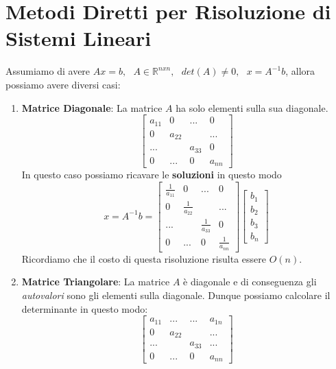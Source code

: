 \documentclass{article}
\begin{document}
\newpage

\section{Metodi Diretti per Risoluzione di Sistemi Lineari}

Assumiamo di avere $Ax = b, \: \: \: A\in \mathbb{R}^{nxn}, \: \: \: det(A)\neq0, \: \: \: x = A^{-1}b$, allora possiamo avere diversi casi:

\begin{enumerate}
    \item \textbf{Matrice Diagonale}: La matrice $A$ ha solo elementi sulla sua diagonale.
    \[ 
    \begin{bmatrix}
    a_{11} & 0 & ...  & 0\\
    0 & a_{22} &  & ...\\
     ...&  & a_{33} &  0\\
     0& ... & 0 & a_{nn}
    \end{bmatrix} 
    \]
    In questo caso possiamo ricavare le \textbf{soluzioni} in questo modo
    \[ x = A^{-1}b = \begin{bmatrix}
    \frac{1}{a_{11}} & 0 & ...  & 0\\
    0 & \frac{1}{a_{22}} &  & ...\\
     ...&  & \frac{1}{a_{33}} &  0\\
     0& ... & 0 & \frac{1}{a_{nn}}
    \end{bmatrix}
    \begin{bmatrix}
    b_{1}\\    
    b_{2}\\
    b_{3}\\
    b_{n}
    \end{bmatrix}  \]
    Ricordiamo che il costo di questa risoluzione risulta essere $O(n)$.
    \item \textbf{Matrice Triangolare}: La matrice $A$ è diagonale e di conseguenza gli \textit{autovalori} sono gli elementi sulla diagonale. Dunque possiamo calcolare il determinante in questo modo:
    \vspace*{10px}
    \[
    \begin{bmatrix}
    a_{11} & ... & ...  & a_{1n}\\
    0 & a_{22} &  & ...\\
     ...&  & a_{33} &  ...\\
     0 & ... & 0 & a_{nn}
    \end{bmatrix}
    \]
    \vspace*{5px}

\end{enumerate}
\end{document}
